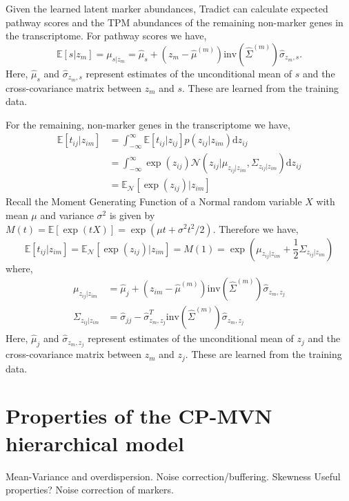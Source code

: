 \documentclass[10pt]{article}
\begin{document}
Given the learned latent marker abundances, Tradict can calculate expected pathway scores and the TPM abundances of the remaining non-marker genes in the transcriptome. For pathway scores we have, 
\[
\mathbb{E}[s|z_m] = \mu_{s|z_m} = \hat{\mu}_s + \left(z_m - \hat{\mu}^{(m)} \right)\textrm{inv}\left( \hat{\Sigma}^{(m)} \right)\hat{\sigma}_{z_{m},s}.
\]
Here, $\hat{\mu}_s $ and $\hat{\sigma}_{z_{m},s}$ represent estimates of the unconditional mean of $s$ and the cross-covariance matrix between $z_m$ and $s$. These are learned from the training data. 

For the remaining, non-marker genes in the transcriptome we have,
\begin{align*}
\mathbb{E}[t_{ij}  | z_{im}] & =  \int_{-\infty}^\infty \mathbb{E}[t_{ij} | z_{ij}] p(z_{ij} | z_{im})  \textrm{d}z_{ij} \\
& = \int_{-\infty}^\infty \exp(z_{ij}) \mathcal{N}(z_{ij} | \mu_{z_{ij} | z_{im}}, \Sigma_{z_{ij} | z_{im}} ) \textrm{d}z_{ij} \\
& = \mathbb{E}_{\mathcal{N}}[\exp(z_{ij}) | z_{im}]
\end{align*}
Recall the Moment Generating Function of a Normal random variable $X$ with mean $\mu$ and variance $\sigma^2$ is given by $M(t) = \mathbb{E}[\exp(tX)] = \exp(\mu t + \sigma^2t^2/2)$. Therefore we have, 
\[
\mathbb{E}[t_{ij}  | z_{im}] = \mathbb{E}_{\mathcal{N}}[\exp(z_{ij}) | z_{im}] = M(1) = \exp \left( \mu_{z_{ij} | z_{im}} + \frac{1}{2}\Sigma_{z_{ij} | z_{im}} \right)
\]
where, 
\begin{align*}
\mu_{z_{ij} | z_{im}} &=  \hat{\mu}_j + \left(z_{im} - \hat{\mu}^{(m)} \right)\textrm{inv}\left( \hat{\Sigma}^{(m)} \right)\hat{\sigma}_{z_{m},z_j} \\
\Sigma_{z_{ij} | z_{im}} &=  \hat{\sigma}_{jj} -  \hat{\sigma}_{z_{m},z_j}^T\textrm{inv}\left( \hat{\Sigma}^{(m)} \right)\hat{\sigma}_{z_{m},z_j}
\end{align*}
Here, $\hat{\mu}_j $ and $\hat{\sigma}_{z_{m},z_j}$ represent estimates of the unconditional mean of $z_j$ and the cross-covariance matrix between $z_m$ and $z_j$. These are learned from the training data. 

\section{Properties of the CP-MVN hierarchical model}
Mean-Variance and overdispersion. Noise correction/buffering. Skewness
Useful properties? Noise correction of markers.
\end{document}
